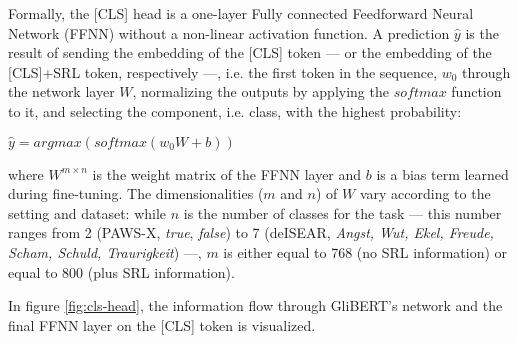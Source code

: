 
Formally, the [CLS] head is a one-layer Fully connected Feedforward Neural Network (FFNN) without a
non-linear activation function. A prediction $\hat{y}$ is the result of sending the embedding
of the [CLS] token --- or the embedding of the [CLS]+SRL token, respectively ---, i.e. the
first token in the sequence, $w_{0}$ through the network layer $W$, normalizing the outputs
by applying the $softmax$ function to it, and selecting the component, i.e. class, with the highest probability:

$\hat{y} = argmax(softmax(w_{0}W+b))$

where $W^{m\times n}$ is the weight matrix of the FFNN layer and $b$ is a bias term learned during
fine-tuning. The dimensionalities ($m$ and $n$) of $W$ vary according to the setting and dataset:
while $n$ is the number of classes for the task --- this number ranges from 2 (PAWS-X, \emph{true},
\emph{false}) to 7 (deISEAR, \emph{Angst, Wut, Ekel, Freude, Scham, Schuld, Traurigkeit}) ---, $m$
is either equal to 768 (no SRL information) or equal to 800 (plus SRL information).

In figure \ref{fig:cls-head}, the information flow through GliBERT's network and the final FFNN
layer on the [CLS] token is visualized.


